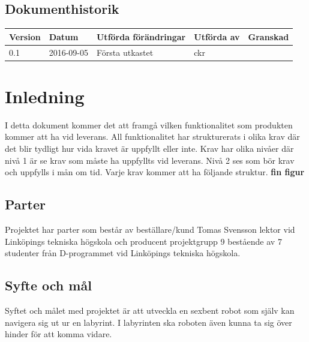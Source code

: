 \documentclass[a4paper,titlepage,12pt]{article}
\begin{document}
\begin{center}
		\section*{Dokumenthistorik}
		\begin{table}[h]
			\begin{tabular}[pos]{| l | l | l | l | l |}
				\hline
				\textbf{Version} & \textbf{Datum} & \textbf{Utförda förändringar} 
				& \textbf{Utförda av} & \textbf{Granskad} \\ \hline

				0.1 & 2016-09-05 & Första utkastet & ckr & \\ \hline

			\end{tabular}
		\end{table}

	\end{center}


	\newpage

	\section{Inledning}
	I detta dokument kommer det att framgå vilken funktionalitet som produkten kommer 
	att ha vid leverans. All funktionalitet har strukturerats i olika krav där det 
	blir tydligt hur vida kravet är uppfyllt eller inte. Krav har olika nivåer där
	nivå 1 är se krav som måste ha uppfyllts vid leverans. Nivå 2 ses som bör krav 
	och uppfylls i mån om tid. Varje krav kommer att ha följande struktur. 
	\textbf{fin figur}

	\subsection{Parter}
	Projektet har parter som består av beställare/kund Tomas Svensson lektor vid 
	Linköpings tekniska högskola och producent projektgrupp 9 bestående av 7 
	studenter från D-programmet vid Linköpings tekniska högskola. 
	\subsection{Syfte och mål}
	Syftet och målet med projektet är att utveckla en sexbent robot som själv
	kan navigera sig ut ur en labyrint. I labyrinten ska roboten även kunna ta 
	sig över hinder för att komma vidare. 
\end{document}
